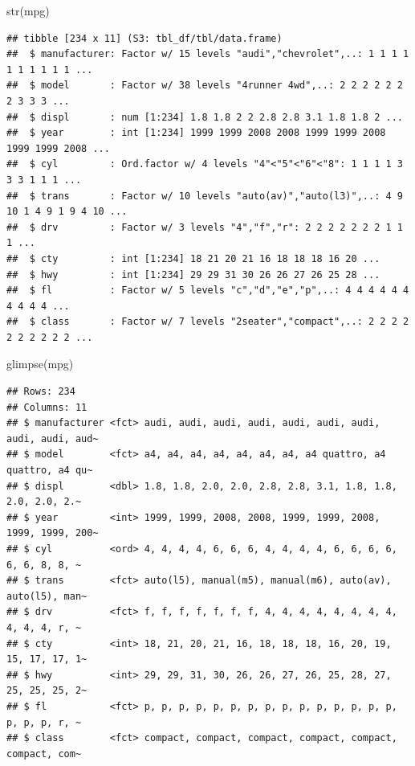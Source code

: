 \documentclass[]{tufte-book}
\newenvironment{Shaded}{}{}
\newcommand{\FunctionTok}[1]{\textcolor[rgb]{0.02,0.16,0.49}{#1}}
\newcommand{\NormalTok}[1]{#1}
\begin{document}
\begin{Shaded}
\begin{Highlighting}[]
\FunctionTok{str}\NormalTok{(mpg)}
\end{Highlighting}
\end{Shaded}

\begin{verbatim}
## tibble [234 x 11] (S3: tbl_df/tbl/data.frame)
##  $ manufacturer: Factor w/ 15 levels "audi","chevrolet",..: 1 1 1 1 1 1 1 1 1 1 ...
##  $ model       : Factor w/ 38 levels "4runner 4wd",..: 2 2 2 2 2 2 2 3 3 3 ...
##  $ displ       : num [1:234] 1.8 1.8 2 2 2.8 2.8 3.1 1.8 1.8 2 ...
##  $ year        : int [1:234] 1999 1999 2008 2008 1999 1999 2008 1999 1999 2008 ...
##  $ cyl         : Ord.factor w/ 4 levels "4"<"5"<"6"<"8": 1 1 1 1 3 3 3 1 1 1 ...
##  $ trans       : Factor w/ 10 levels "auto(av)","auto(l3)",..: 4 9 10 1 4 9 1 9 4 10 ...
##  $ drv         : Factor w/ 3 levels "4","f","r": 2 2 2 2 2 2 2 1 1 1 ...
##  $ cty         : int [1:234] 18 21 20 21 16 18 18 18 16 20 ...
##  $ hwy         : int [1:234] 29 29 31 30 26 26 27 26 25 28 ...
##  $ fl          : Factor w/ 5 levels "c","d","e","p",..: 4 4 4 4 4 4 4 4 4 4 ...
##  $ class       : Factor w/ 7 levels "2seater","compact",..: 2 2 2 2 2 2 2 2 2 2 ...
\end{verbatim}

\begin{Shaded}
\begin{Highlighting}[]
\FunctionTok{glimpse}\NormalTok{(mpg)}
\end{Highlighting}
\end{Shaded}

\begin{verbatim}
## Rows: 234
## Columns: 11
## $ manufacturer <fct> audi, audi, audi, audi, audi, audi, audi, audi, audi, aud~
## $ model        <fct> a4, a4, a4, a4, a4, a4, a4, a4 quattro, a4 quattro, a4 qu~
## $ displ        <dbl> 1.8, 1.8, 2.0, 2.0, 2.8, 2.8, 3.1, 1.8, 1.8, 2.0, 2.0, 2.~
## $ year         <int> 1999, 1999, 2008, 2008, 1999, 1999, 2008, 1999, 1999, 200~
## $ cyl          <ord> 4, 4, 4, 4, 6, 6, 6, 4, 4, 4, 4, 6, 6, 6, 6, 6, 6, 8, 8, ~
## $ trans        <fct> auto(l5), manual(m5), manual(m6), auto(av), auto(l5), man~
## $ drv          <fct> f, f, f, f, f, f, f, 4, 4, 4, 4, 4, 4, 4, 4, 4, 4, 4, r, ~
## $ cty          <int> 18, 21, 20, 21, 16, 18, 18, 18, 16, 20, 19, 15, 17, 17, 1~
## $ hwy          <int> 29, 29, 31, 30, 26, 26, 27, 26, 25, 28, 27, 25, 25, 25, 2~
## $ fl           <fct> p, p, p, p, p, p, p, p, p, p, p, p, p, p, p, p, p, p, r, ~
## $ class        <fct> compact, compact, compact, compact, compact, compact, com~
\end{verbatim}
\end{document}
